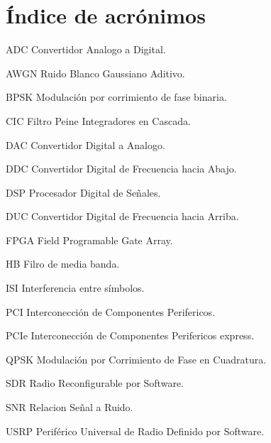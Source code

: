 \chapter*{\'Indice de acr\'onimos}
%

\begin{symbollist*}

\item[ADC]  Convertidor Analogo a Digital.
\item[AWGN] Ruido Blanco Gaussiano Aditivo.
\item[BPSK] Modulaci\'on por corrimiento de fase binaria.
\item[CIC]  Filtro Peine Integradores en Cascada.
\item[DAC]  Convertidor Digital a Analogo.
\item[DDC]  Convertidor Digital de Frecuencia hacia Abajo.
\item[DSP]  Procesador Digital de Se\~nales.
\item[DUC]  Convertidor Digital de Frecuencia hacia Arriba.
\item[FPGA] Field Programable Gate Array.
\item[HB]   Filro de media banda.
\item[ISI]  Interferencia entre s\'imbolos.
\item[PCI]  Interconecci\'on de Componentes Perifericos.
\item[PCIe] Interconecci\'on de Componentes Perifericos express.
\item[QPSK] Modulaci\'on por Corrimiento de Fase en Cuadratura.
\item[SDR]  Radio Reconfigurable por Software.
\item[SNR]  Relacion Se\~nal a Ruido.
\item[USRP] Perif\'erico Universal de Radio Definido por Software.

\end{symbollist*}